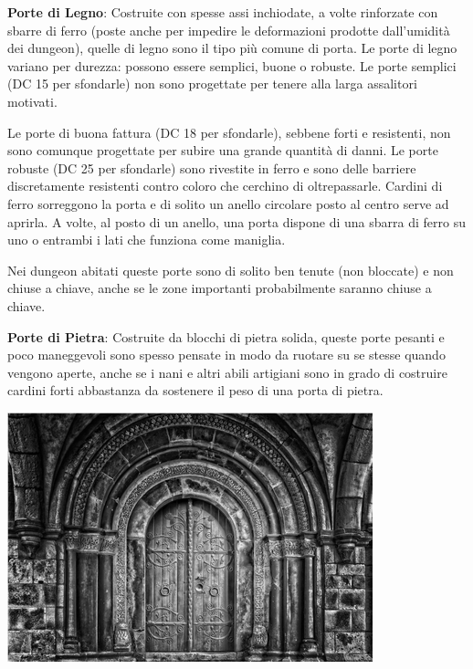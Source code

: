 \begin{multicols}{2}

\medskip

\textbf{Porte di Legno}: Costruite con spesse assi inchiodate, a volte rinforzate con sbarre di ferro (poste anche per impedire le deformazioni prodotte dall'umidità dei dungeon), quelle di legno sono il tipo più comune di porta. Le porte di legno variano per durezza: possono essere semplici, buone o robuste. Le porte semplici (DC 15 per sfondarle) non sono progettate per tenere alla larga assalitori motivati.

Le porte di buona fattura (DC 18 per sfondarle), sebbene forti e resistenti, non sono comunque progettate per subire una grande quantità di danni. Le porte robuste (DC 25 per sfondarle) sono rivestite in ferro e sono delle barriere discretamente resistenti contro coloro che cerchino di oltrepassarle. Cardini di ferro sorreggono la porta e di solito un anello circolare posto al centro serve ad aprirla. A volte, al posto di un anello, una porta dispone di una sbarra di ferro su uno o entrambi i lati che funziona come maniglia.

Nei dungeon abitati queste porte sono di solito ben tenute (non bloccate) e non chiuse a chiave, anche se le zone importanti probabilmente saranno chiuse a chiave.

\textbf{Porte di Pietra}: Costruite da blocchi di pietra solida, queste porte pesanti e poco maneggevoli sono spesso pensate in modo da ruotare su se stesse quando vengono aperte, anche se i nani e altri abili artigiani sono in grado di costruire cardini forti abbastanza da sostenere il peso di una porta di pietra.

\begin{center}
	\includegraphics[width=0.9\linewidth]{immagini/porta_grey.png}
\end{center}


\end{multicols}
